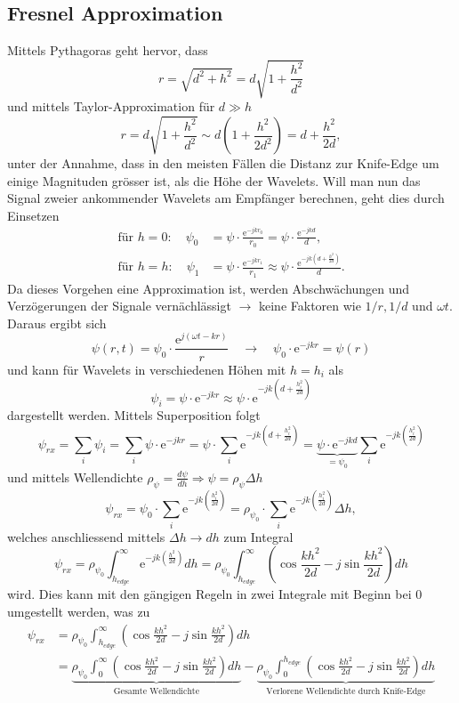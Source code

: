 \subsection{Fresnel Approximation}
Mittels Pythagoras geht hervor, dass 
\[
r 
= 
\sqrt{d^2 + h^2}
=
d \sqrt{1 + \frac{h^2}{d^2}}
\]
und mittels Taylor-Approximation für $d \gg h$
\[
r 
=
d \sqrt{1 + \frac{h^2}{d^2}}
\sim
d \left( 1 + \frac{h^2}{2d^2} \right)
=
d + \frac{h^2}{2d},
\]
unter der Annahme, dass in den meisten Fällen die Distanz zur Knife-Edge um einige Magnituden grösser ist,
als die Höhe der Wavelets.
Will man nun das Signal zweier ankommender Wavelets am Empfänger berechnen, geht dies durch Einsetzen
\begin{align*}
    \text{für } h = 0: \quad \psi_0
    &=
    \psi \cdot \frac{\mathrm{e}^{-jkr_0}}{r_0}
    =
    \psi \cdot \frac{\mathrm{e}^{-jkd}}{d},
    \\
    \text{für } h = h: \quad \psi_1
    &=
    \psi \cdot \frac{\mathrm{e}^{-jkr_1}}{r_1}
    \approx
    \psi \cdot \frac{\mathrm{e}^{-jk\left(d+\frac{h^2}{2d}\right)}}{d}.
\end{align*}
Da dieses Vorgehen eine Approximation ist, 
werden Abschwächungen und Verzögerungen der Signale vernächlässigt
$\to$ keine Faktoren wie $1/r, 1/d$ und $\omega t$. Daraus ergibt sich
\[
\psi (r,t)
=
\psi_0 \cdot \frac{\mathrm{e}^{j(\omega t - kr)}}{r}
\quad \to \quad
\psi_0 \cdot \mathrm{e}^{-jkr}
=
\psi (r)
\]
und kann für Wavelets in verschiedenen Höhen mit $h = h_i$ als
\[
\psi_i
=
\psi \cdot \mathrm{e}^{-jkr}
\approx
\psi \cdot \mathrm{e}^{-jk\left(d+\frac{h^2_i}{2d}\right)}
\]
dargestellt werden. Mittels Superposition folgt
\[
\psi_{rx}
=
\sum_i \psi_i
=
\sum_i \psi \cdot \mathrm{e}^{-jkr}
=
\psi \cdot \sum_i \mathrm{e}^{-jk\left(d+\frac{h^2_i}{2d}\right)}
=
\underbrace{\psi \cdot \mathrm{e}^{-jkd}}_{=\psi_0} \sum_i \mathrm{e}^{-jk\left(\frac{h^2_i}{2d}\right)}
\]
und mittels Wellendichte $\rho_{\psi} = \frac{d\psi}{dh} \Rightarrow \psi = \rho_{\psi} \Delta h $
\[
\psi_{rx}
=
\psi_0 \cdot \sum_i \mathrm{e}^{-jk\left(\frac{h^2_i}{2d}\right)}
=
\rho_{\psi_0} \cdot \sum_i \mathrm{e}^{-jk\left(\frac{h^2_i}{2d}\right)} \Delta h,
\]
welches anschliessend mittels $\Delta h \to dh$ zum Integral
\[
\psi_{rx}
=
\rho_{\psi_0} \int_{h_{edge}}^{\infty} \mathrm{e}^{-jk\left(\frac{h^2}{2d}\right)} dh
=
\rho_{\psi_0} \int_{h_{edge}}^{\infty} \left(\cos \frac{kh^2}{2d} - j \sin \frac{kh^2}{2d}\right) dh
\]
wird.
Dies kann mit den gängigen Regeln in zwei Integrale mit Beginn bei 0 umgestellt werden, was zu
\begin{align*}
    \psi_{rx}
    &=
    \rho_{\psi_0} \int_{h_{edge}}^{\infty} \left(\cos \frac{kh^2}{2d} - j \sin \frac{kh^2}{2d}\right) dh
    \\
    &=
    \underbrace{\rho_{\psi_0} \int_{0}^{\infty} \left(\cos \frac{kh^2}{2d} - j \sin \frac{kh^2}{2d}\right) dh}_{\text{Gesamte Wellendichte}}
    -
    \underbrace{\rho_{\psi_0} \int_{0}^{h_{edge}} \left(\cos \frac{kh^2}{2d} - j \sin \frac{kh^2}{2d}\right) dh}_{\text{Verlorene Wellendichte durch Knife-Edge}}  
\end{align*}
